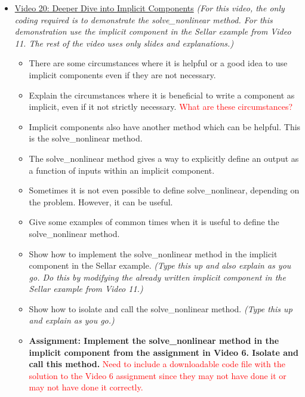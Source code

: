 \documentclass[12pt, letterpaper]{article}
\begin{document}
\begin{itemize}
	\item \underline{Video 20: Deeper Dive into Implicit Components} \textit{(For this video, the only coding required is to demonstrate the solve\_nonlinear method. For this demonstration use the implicit component in the Sellar example from Video 11. The rest of the video uses only slides and explanations.)}
		\begin{itemize}
			\item There are some circumstances where it is helpful or a good idea to use implicit components even if they are not necessary.
			\item Explain the circumstances where it is beneficial to write a component as implicit, even if it not strictly necessary. \textcolor{red}{What are these circumstances?}
			\item Implicit components also have another method which can be helpful. This is the solve\_nonlinear method.
			\item The solve\_nonlinear method gives a way to explicitly define an output as a function of inputs within an implicit component.
			\item Sometimes it is not even possible to define solve\_nonlinear, depending on the problem. However, it can be useful.
			\item Give some examples of common times when it is useful to define the solve\_nonlinear method.
			\item Show how to implement the solve\_nonlinear method in the implicit component in the Sellar example. \textit{(Type this up and also explain as you go. Do this by modifying the already written implicit component in the Sellar example from Video 11.)}
			\item Show how to isolate and call the solve\_nonlinear method. \textit{(Type this up and explain as you go.)}
			\item \textbf{Assignment: Implement the solve\_nonlinear method in the implicit component from the assignment in Video 6. Isolate and call this method.} \textcolor{red}{Need to include a downloadable code file with the solution to the Video 6 assignment since they may not have done it or may not have done it correctly.}
		\end{itemize}


\end{itemize}
\end{document}

